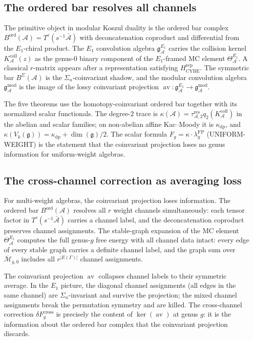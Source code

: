 \documentclass[11pt]{article}
\theoremstyle{definition}
\theoremstyle{remark}
\newcommand{\cA}{\mathcal{A}}
\newcommand{\cM}{\mathcal{M}}
\newcommand{\fg}{\mathfrak{g}}
\newcommand{\FP}{\mathrm{FP}}
\newcommand{\cross}{\mathrm{cross}}
\DeclareMathOperator{\av}{av}
\DeclareMathOperator{\ord}{ord}
\numberwithin{equation}{section}
\begin{document}
\subsection{The ordered bar resolves all channels}

The primitive object in modular Koszul duality is the
ordered bar complex
$B^{\ord}(\cA) = T^c(s^{-1}\bar{\cA})$
with deconcatenation coproduct and differential from the
$E_1$-chiral product.
The $E_1$ convolution algebra $\fg^{E_1}_{\cA}$ carries the collision
kernel $K_\cA^{\mathrm{coll}}(z)$ as the genus-$0$ binary component of
the $E_1$-framed MC element $\Theta^{E_1}_{\cA}$.  A classical
$r$-matrix appears after a representation satisfying
$H_{\mathrm{CYBE}}^{\mathrm{rep}}$.
The symmetric bar $B^{\Sigma}(\cA)$ is the
$\Sigma_n$-coinvariant shadow, and the modular convolution
algebra $\fg^{\mathrm{mod}}_{\cA}$ is the image of the lossy
coinvariant projection
$\av \colon \fg^{E_1}_{\cA} \to \fg^{\mathrm{mod}}_{\cA}$.

The five theorems use the homotopy-coinvariant ordered bar together
with its normalized scalar functionals. The degree-$2$ trace is
$\kappa(\cA)=\tau_{\cA,2}^{\mathrm{res}}
q_2(K_\cA^{\mathrm{coll}})$ in the abelian and scalar families; on
non-abelian affine Kac--Moody it is $\kappa_{\mathrm{dp}}$, and
$\kappa(V_k(\fg))=\kappa_{\mathrm{dp}}+\dim(\fg)/2$.
The scalar formula
$F_g = \kappa \cdot \lambda_g^{\FP}$ (UNIFORM-WEIGHT) is the
statement that the coinvariant projection loses no genus
information for uniform-weight algebras.

\subsection{The cross-channel correction as averaging loss}

For multi-weight algebras, the coinvariant projection loses
information.
The ordered bar $B^{\ord}(\cA)$ resolves all $r$ weight
channels simultaneously: each tensor factor in
$T^c(s^{-1}\bar{\cA})$ carries a channel label, and the
deconcatenation coproduct preserves channel assignments.
The stable-graph expansion of the MC element $\Theta^{E_1}_{\cA}$
computes the full genus-$g$ free energy with all channel
data intact: every edge of every stable graph carries a
definite channel label, and the graph sum over
$\overline{\cM}_{g,0}$ includes all $r^{|E(\Gamma)|}$
channel assignments.

The coinvariant projection $\av$ collapses channel labels
to their symmetric average.
In the $E_1$ picture, the diagonal channel assignments
(all edges in the same channel) are $\Sigma_n$-invariant
and survive the projection; the mixed channel assignments
break the permutation symmetry and are killed.
The cross-channel correction $\delta F_g^{\cross}$ is
precisely the content of $\ker(\av)$ at genus $g$: it is
the information about the ordered bar complex that the
coinvariant projection discards.
\end{document}
